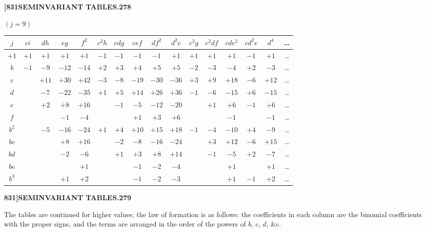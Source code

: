 \documentclass[12pt,a4paper]{article}
\theoremstyle{definition}
\begin{document}
\newpage
\setcounter{page}{278}

\noindent\textbf{[831}\hfill\textbf{SEMINVARIANT TABLES.}\hfill\textbf{278}

\bigskip

\noindent $(j = 9)$
\begin{center}
\small
\begin{tabular}{|c|c|c|c|c|c|c|c|c|c|c|c|c|c|c|c|}
\hline
$j$ & $ci$ & $dh$ & $eg$ & $f^2$ & $c^2h$ & $cdg$ & $cef$ & $df^2$ & $d^2e$ & $c^3g$ & $c^2df$ & $cde^2$ & $cd^2e$ & $d^4$ & \dots \\
\hline
$+1$ & $+1$ & $+1$ & $+1$ & $+1$ & $-1$ & $-1$ & $-1$ & $-1$ & $+1$ & $+1$ & $+1$ & $+1$ & $-1$ & $+1$ & \dots \\
$b$ & $-1$ & $-9$ & $-12$ & $-14$ & $+2$ & $+3$ & $+4$ & $+5$ & $+5$ & $-2$ & $-3$ & $-4$ & $+2$ & $-3$ & \dots \\
$c$ & & $+11$ & $+30$ & $+42$ & $-3$ & $-8$ & $-19$ & $-30$ & $-36$ & $+3$ & $+9$ & $+18$ & $-6$ & $+12$ & \dots \\
$d$ & & $-7$ & $-22$ & $-35$ & $+1$ & $+5$ & $+14$ & $+26$ & $+36$ & $-1$ & $-6$ & $-15$ & $+6$ & $-15$ & \dots \\
$e$ & & $+2$ & $+8$ & $+16$ & & $-1$ & $-5$ & $-12$ & $-20$ & & $+1$ & $+6$ & $-1$ & $+6$ & \dots \\
$f$ & & & $-1$ & $-4$ & & & $+1$ & $+3$ & $+6$ & & & $-1$ & & $-1$ & \dots \\
$b^2$ & & $-5$ & $-16$ & $-24$ & $+1$ & $+4$ & $+10$ & $+15$ & $+18$ & $-1$ & $-4$ & $-10$ & $+4$ & $-9$ & \dots \\
$bc$ & & & $+8$ & $+16$ & & $-2$ & $-8$ & $-16$ & $-24$ & & $+3$ & $+12$ & $-6$ & $+15$ & \dots \\
$bd$ & & & $-2$ & $-6$ & & $+1$ & $+3$ & $+8$ & $+14$ & & $-1$ & $-5$ & $+2$ & $-7$ & \dots \\
$be$ & & & & $+1$ & & & $-1$ & $-2$ & $-4$ & & & $+1$ & & $+1$ & \dots \\
$b^3$ & & & $+1$ & $+2$ & & & $-1$ & $-2$ & $-3$ & & & $+1$ & $-1$ & $+2$ & \dots \\
\hline
\end{tabular}
\end{center}

\newpage
\setcounter{page}{279}

\noindent\textbf{831]}\hfill\textbf{SEMINVARIANT TABLES.}\hfill\textbf{279}

\bigskip

\noindent The tables are continued for higher values; the law of formation is as follows: the coefficients in each column are the binomial coefficients with the proper signs, and the terms are arranged in the order of the powers of $b$, $c$, $d$, \&c.
\end{document}
